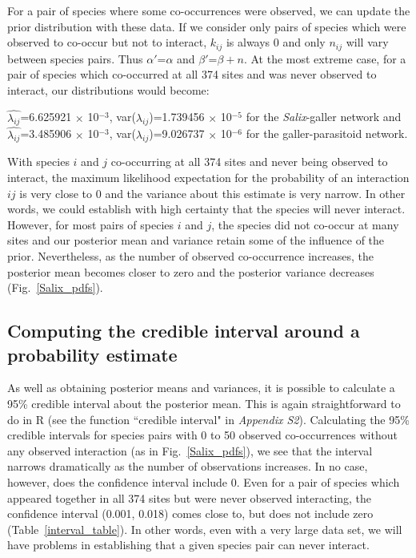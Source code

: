 \documentclass[12pt]{article}
\begin{document}
      For a pair of species where some co-occurrences were observed, we can update the prior distribution with these data. If we consider only pairs of species which were observed to co-occur but not to interact, $k_{ij}$ is always 0 and only $n_{ij}$ will vary between species pairs. Thus $\alpha'$=$\alpha$ and $\beta'$=$\beta + n$. At the most extreme case, for a pair of species which co-occurred at all 374 sites and was never observed to interact, our distributions would become:


      $\hat{\lambda_{ij}}$=6.625921 $\times$ 10$^{-3}$, var($\lambda_{ij}$)=1.739456 $\times$ 10$^{-5}$ for the \emph{Salix}-galler network and 
      $\hat{\lambda_{ij}}$=3.485906 $\times$ 10$^{-3}$, var($\lambda_{ij}$)=9.026737 $\times$ 10$^{-6}$ for the galler-parasitoid network.

      
      With species $i$ and $j$ co-occurring at all 374 sites and never being observed to interact, the maximum likelihood expectation for the probability of an interaction $ij$ is very close to 0 and the variance about this estimate is very narrow. In other words, we could establish with high certainty that the species will never interact. However, for most pairs of species $i$ and $j$, the species did not co-occur at many sites and our posterior mean and variance retain some of the influence of the prior. Nevertheless, as the number of observed co-occurrence increases, the posterior mean becomes closer to zero and the posterior variance decreases (Fig.~\ref{Salix_pdfs}).


  \subsection*{Computing the credible interval around a probability estimate}

      As well as obtaining posterior means and variances, it is possible to calculate a 95\% credible interval about the posterior mean. This is again straightforward to do in R (see the function ``credible interval" in \emph{Appendix S2}). Calculating the 95\% credible intervals for species pairs with 0 to 50 observed co-occurrences without any observed interaction (as in Fig.~\ref{Salix_pdfs}), we see that the interval narrows dramatically as the number of observations increases. In no case, however, does the confidence interval include 0. Even for a pair of species which appeared together in all 374 sites but were never observed interacting, the confidence interval (0.001, 0.018) comes close to, but does not include zero (Table~\ref{interval_table}). In other words, even with a very large data set, we will have problems in establishing that a given species pair can never interact.
\end{document}
